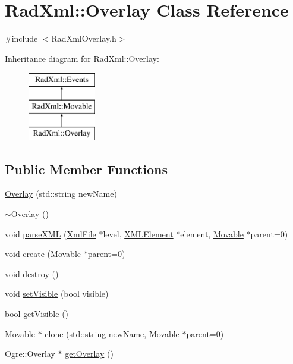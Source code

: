 \hypertarget{class_rad_xml_1_1_overlay}{\section{Rad\-Xml\-:\-:Overlay Class Reference}
\label{class_rad_xml_1_1_overlay}
}


{\ttfamily \#include $<$Rad\-Xml\-Overlay.\-h$>$}

Inheritance diagram for Rad\-Xml\-:\-:Overlay\-:\begin{figure}[H]
\begin{center}
\leavevmode
\includegraphics[height=3.000000cm]{class_rad_xml_1_1_overlay}
\end{center}
\end{figure}
\subsection*{Public Member Functions}
\begin{DoxyCompactItemize}
\item 
\hyperlink{class_rad_xml_1_1_overlay_a5a235d6ea5f04f455b6d4b92dc5614b7}{Overlay} (std\-::string new\-Name)
\item 
\hyperlink{class_rad_xml_1_1_overlay_a733ab322a80b92d641c9d3bf024f8f72}{$\sim$\-Overlay} ()
\item 
void \hyperlink{class_rad_xml_1_1_overlay_aa2ad668b16aa1842d6a7fa1731f4c080}{parse\-X\-M\-L} (\hyperlink{class_rad_xml_1_1_xml_file}{Xml\-File} $\ast$level, \hyperlink{class_x_m_l_element}{X\-M\-L\-Element} $\ast$element, \hyperlink{class_rad_xml_1_1_movable}{Movable} $\ast$parent=0)
\item 
void \hyperlink{class_rad_xml_1_1_overlay_a3612f4a8d522eed8d79a64595ba15312}{create} (\hyperlink{class_rad_xml_1_1_movable}{Movable} $\ast$parent=0)
\item 
void \hyperlink{class_rad_xml_1_1_overlay_af4e6177a56abfc445fb471d0bd21464a}{destroy} ()
\item 
void \hyperlink{class_rad_xml_1_1_overlay_aaa1e2699f00d3877b1bc6558bfe13b45}{set\-Visible} (bool visible)
\item 
bool \hyperlink{class_rad_xml_1_1_overlay_a20b4caaaeb17729b634ae8646c3288da}{get\-Visible} ()
\item 
\hyperlink{class_rad_xml_1_1_movable}{Movable} $\ast$ \hyperlink{class_rad_xml_1_1_overlay_aa5fb1b414b9553f91acbdfb21cb9eb7e}{clone} (std\-::string new\-Name, \hyperlink{class_rad_xml_1_1_movable}{Movable} $\ast$parent=0)
\item 
Ogre\-::\-Overlay $\ast$ \hyperlink{class_rad_xml_1_1_overlay_ace25ba85188e5a716434c9ae9370bcf6}{get\-Overlay} ()
\end{DoxyCompactItemize}
